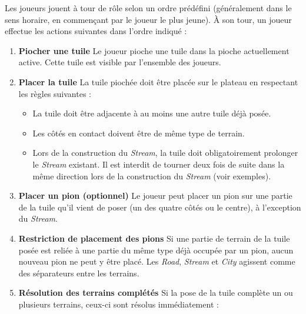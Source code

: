 \documentclass[a4paper]{article}
\begin{document}
Les joueurs jouent à tour de rôle selon un ordre prédéfini (généralement dans le sens horaire, en commençant par le joueur le plus jeune).  
À son tour, un joueur effectue les actions suivantes dans l’ordre indiqué :

\begin{enumerate}
  \item \textbf{Piocher une tuile}  
  Le joueur pioche une tuile dans la pioche actuellement active. Cette tuile est visible par l’ensemble des joueurs.

  \item \textbf{Placer la tuile}  
  La tuile piochée doit être placée sur le plateau en respectant les règles suivantes :
  \begin{itemize}
    \item[-] La tuile doit être adjacente à au moins une autre tuile déjà posée.
    \item[-] Les côtés en contact doivent être de même type de terrain.
    \item[-] Lors de la construction du \textit{Stream}, la tuile doit obligatoirement prolonger le \textit{Stream} existant.
    Il est interdit de tourner deux fois de suite dans la même direction lors de la construction du \textit{Stream} (voir exemples).
  \end{itemize}

  \item \textbf{Placer un pion (optionnel)}  
  Le joueur peut placer un pion sur une partie de la tuile qu’il vient de poser (un des quatre côtés ou le centre), à l’exception du \textit{Stream}.

  \item \textbf{Restriction de placement des pions}  
  Si une partie de terrain de la tuile posée est reliée à une partie du même type déjà occupée par un pion, aucun nouveau pion ne peut y être placé.  
  Les \textit{Road}, \textit{Stream} et \textit{City} agissent comme des séparateurs entre les terrains.

  \item \textbf{Résolution des terrains complétés}  
  Si la pose de la tuile complète un ou plusieurs terrains, ceux-ci sont résolus immédiatement :
\end{enumerate}
\end{document}
